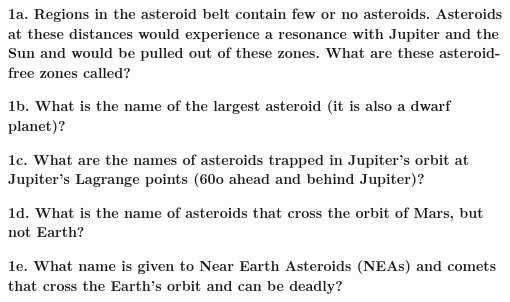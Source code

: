 \documentclass{report}
\title{\Huge{}}
\author{\huge{Nathan Warner}}
\date{\huge{}}
\begin{document}
    \bigbreak \noindent 
    \textbf{1a. Regions in the asteroid belt contain few or no asteroids. Asteroids at these distances
would experience a resonance with Jupiter and the Sun and would be pulled out of these zones.
What are these asteroid-free zones called?}
\bigbreak \noindent 

    \bigbreak \noindent 
    \textbf{1b. What is the name of the largest asteroid (it is also a dwarf planet)?} 
    \bigbreak \noindent 

    \bigbreak \noindent 
    \textbf{1c. What are the names of asteroids trapped in Jupiter’s orbit at Jupiter’s Lagrange points (60o
    ahead and behind Jupiter)?}
    \bigbreak \noindent 

    \bigbreak \noindent 
    \textbf{1d. What is the name of asteroids that cross the orbit of Mars, but not Earth?}
    \bigbreak \noindent 

    \bigbreak \noindent 
    \textbf{1e. What name is given to Near Earth Asteroids (NEAs) and comets that cross the Earth’s orbit
and can be deadly?}
    \bigbreak \noindent 
\end{document}
